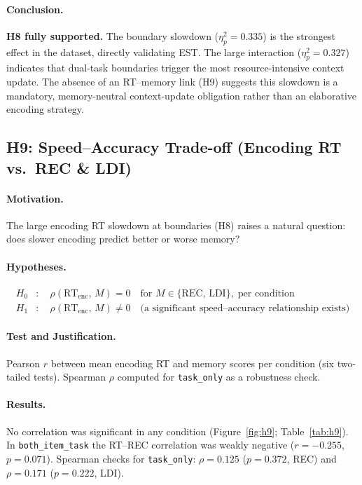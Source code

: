 \documentclass[10pt,a4paper]{article}
\begin{document}
\paragraph{Conclusion.}
\textbf{H8 fully supported.} The boundary slowdown ($\eta^2_p{=}0.335$) is the strongest effect in the dataset, directly validating EST. The large interaction ($\eta^2_p{=}0.327$) indicates that dual-task boundaries trigger the most resource-intensive context update. The absence of an RT--memory link (H9) suggests this slowdown is a mandatory, memory-neutral context-update obligation rather than an elaborative encoding strategy.

\subsection*{H9: Speed--Accuracy Trade-off (Encoding RT vs.\ REC \& LDI)}

\paragraph{Motivation.}
The large encoding RT slowdown at boundaries (H8) raises a natural question: does slower encoding predict better or worse memory?

\paragraph{Hypotheses.}
\begin{align*}
  H_0 &:\quad \rho(\mathrm{RT}_{\mathrm{enc}},\, M) = 0 \quad \text{for } M \in \{\mathrm{REC},\, \mathrm{LDI}\},\; \text{per condition} \\
  H_1 &:\quad \rho(\mathrm{RT}_{\mathrm{enc}},\, M) \neq 0 \quad \text{(a significant speed--accuracy relationship exists)}
\end{align*}

\paragraph{Test and Justification.}
Pearson $r$ between mean encoding RT and memory scores per condition (six two-tailed tests). Spearman $\rho$ computed for \texttt{task\_only} as a robustness check.

\paragraph{Results.}
No correlation was significant in any condition (Figure~\ref{fig:h9}; Table~\ref{tab:h9}). In \texttt{both\_item\_task} the RT--REC correlation was weakly negative ($r{=}{-}0.255$, $p{=}0.071$). Spearman checks for \texttt{task\_only}: $\rho{=}0.125$ ($p{=}0.372$, REC) and $\rho{=}0.171$ ($p{=}0.222$, LDI).
\end{document}
